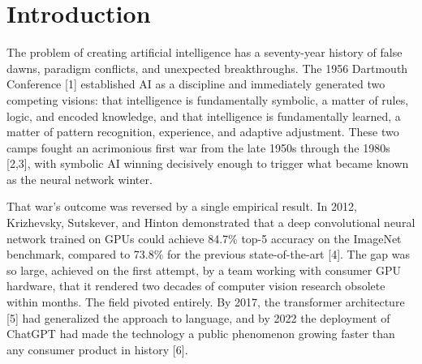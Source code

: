 \documentclass[12pt]{article}
\begin{document}
\begin{abstract}
Two perturbation experiments directly test whether the detected phase
structure has functional reality. Experiment 3.1 (attention mask
perturbation, \(n = 14\) models) finds a 43\% pass rate: the
\(\phi\)-zone does not consistently absorb position-leak noise faster
than adjacent zones when measured as a continuous decay rate. Experiment
3.2 (activation steering, \(n = 14\) models) finds a 100\% pass rate
across all 14 valid models and both noise types (random Gaussian and
structured mean-pool): the \(\phi\)-zone has a shorter perturbation
half-life than surrounding zones in every architecture tested, with
\(\phi\)-advantage scaling monotonically with model depth (distilGPT-2:
+1.5 layers; GPT-2 XL: +10.1 layers; Mistral-7B: +6.9 layers). The
half-life metric measures how quickly the zone brings a perturbation
below 50\% of its injection magnitude; the 100\% pass rate confirms that
the \(\phi\)-zone is a genuine self-stabilizing attractor in this
functional sense, even in models whose interior zone balance is
structurally disrupted by post-training alignment procedures.
Falsifiable predictions and evidence grades are given throughout. All
tholonic claims are graded by strength; speculative claims are flagged
as open problems.
\end{abstract}

\section{Introduction}\label{introduction}

The problem of creating artificial intelligence has a seventy-year
history of false dawns, paradigm conflicts, and unexpected
breakthroughs. The 1956 Dartmouth Conference {[}1{]} established AI as a
discipline and immediately generated two competing visions: that
intelligence is fundamentally symbolic, a matter of rules, logic, and
encoded knowledge, and that intelligence is fundamentally learned, a
matter of pattern recognition, experience, and adaptive adjustment.
These two camps fought an acrimonious first war from the late 1950s
through the 1980s {[}2,3{]}, with symbolic AI winning decisively enough
to trigger what became known as the neural network winter.

That war's outcome was reversed by a single empirical result. In 2012,
Krizhevsky, Sutskever, and Hinton demonstrated that a deep convolutional
neural network trained on GPUs could achieve 84.7\% top-5 accuracy on
the ImageNet benchmark, compared to 73.8\% for the previous
state-of-the-art {[}4{]}. The gap was so large, achieved on the first
attempt, by a team working with consumer GPU hardware, that it rendered
two decades of computer vision research obsolete within months. The
field pivoted entirely. By 2017, the transformer architecture {[}5{]}
had generalized the approach to language, and by 2022 the deployment of
ChatGPT had made the technology a public phenomenon growing faster than
any consumer product in history {[}6{]}.
\end{document}
